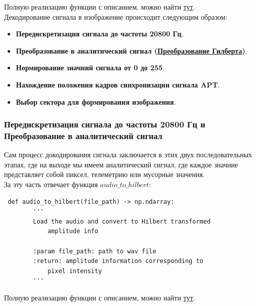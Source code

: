 \documentclass[a4paper, 14pt, titlepage, fleqn]{extarticle}
\begin{document}
	\noindent Полную реализацию функции с описанием, можно найти \href{https://github.com/kitfloppa/sdr-sat-receiving/blob/main/script_noaa_decoder.py#L35}{тут}. \\

	\noindent Декодирование сигнала в изображение происходит следующим образом:

	\begin{itemize}
		\item \textbf{Передискретизация сигнала до частоты 20800 Гц}.
		\item \textbf{Преобразование в аналитический сигнал (\href{https://en.wikipedia.org/wiki/Hilbert_transform}{Преобразование Гилберта})}.
		\item \textbf{Нормирование значний сигнала от 0 до 255}.
		\item \textbf{Нахождение положения кадров синхронизации сигнала APT}.
		\item \textbf{Выбор сектора для формирования изображения}.
	\end{itemize}

	\pagebreak
	\subsubsection*{Передискретизация сигнала до частоты 20800 Гц и Преобразование в аналитический сигнал}
	
	Сам процесс докодирования сигнала заключается в этих двух последовательных этапах, где на выходе мы имеем аналитический сигнал, где каждое значние представляет собой пиксел, телеметрию или мусорные значения. \\
	
	За эту часть отвечает функция $audio\_to\_hilbert$:
	
	\begin{verbatim}
 def audio_to_hilbert(file_path) -> np.ndarray:
        '''
        Load the audio and convert to Hilbert transformed 
        	amplitude info

        :param file_path: path to wav file
        :return: amplitude information corresponding to 
        	pixel intensity
        '''
	\end{verbatim}
	
	\noindent Полную реализацию функции с описанием, можно найти \href{https://github.com/kitfloppa/sdr-sat-receiving/blob/main/script_noaa_decoder.py#L55}{тут}. \\
	
\end{document}
